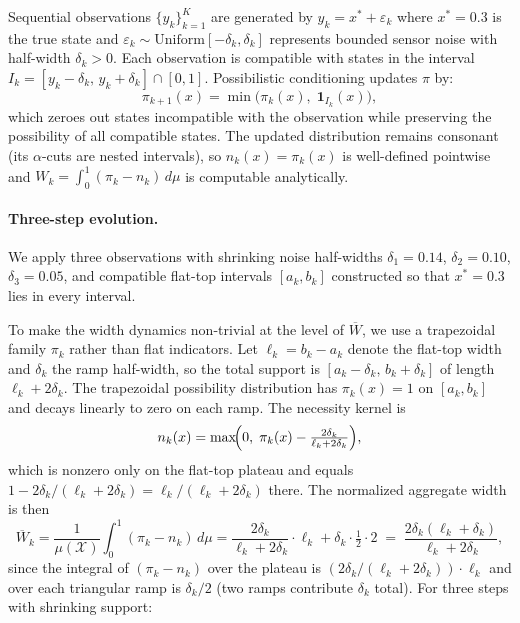 \documentclass[12pt]{article}
\newcommand{\calX}{\mathcal{X}}
\begin{document}
Sequential observations $\{y_k\}_{k=1}^K$ are generated by $y_k = x^* + \varepsilon_k$
where $x^* = 0.3$ is the true state and $\varepsilon_k \sim \mathrm{Uniform}[-\delta_k, \delta_k]$
represents bounded sensor noise with half-width $\delta_k > 0$.
Each observation is compatible with states in the interval
$I_k = [y_k - \delta_k,\, y_k + \delta_k] \cap [0,1]$.
Possibilistic conditioning updates $\pi$ by:
\begin{equation}
\pi_{k+1}(x) = \min\!\bigl(\pi_k(x),\; \mathbf{1}_{I_k}(x)\bigr),
\label{eq:scalar_update}
\end{equation}
which zeroes out states incompatible with the observation while preserving
the possibility of all compatible states.
The updated distribution remains consonant (its $\alpha$-cuts are nested
intervals), so $n_k(x) = \pi_k(x)$ is well-defined pointwise and
$W_k = \int_0^1 (\pi_k - n_k)\,d\mu$ is computable analytically.

\paragraph{Three-step evolution.}
We apply three observations with shrinking noise half-widths
$\delta_1=0.14$, $\delta_2=0.10$, $\delta_3=0.05$,
and compatible flat-top intervals $[a_k,b_k]$ constructed so that
$x^*=0.3$ lies in every interval.

To make the width dynamics non-trivial at the level of $\overline{W}$, we
use a trapezoidal family $\pi_k$ rather than flat indicators.
Let $\ell_k = b_k - a_k$ denote the flat-top width and $\delta_k$ the
ramp half-width, so the total support is $[a_k - \delta_k,\, b_k + \delta_k]$
of length $\ell_k + 2\delta_k$.
The trapezoidal possibility distribution has $\pi_k(x) = 1$ on $[a_k, b_k]$
and decays linearly to zero on each ramp.
The necessity kernel is
\begin{equation}
n_k(x) = \max\!\Bigl(0,\; \pi_k(x) - \tfrac{2\delta_k}{\ell_k + 2\delta_k}\Bigr),
\label{eq:trapez_n}
\end{equation}
which is nonzero only on the flat-top plateau and equals
$1 - 2\delta_k/(\ell_k + 2\delta_k) = \ell_k/(\ell_k + 2\delta_k)$ there.
The normalized aggregate width is then
\begin{equation}
\overline{W}_k
= \frac{1}{\mu(\calX)}\int_0^1 (\pi_k - n_k)\,d\mu
= \frac{2\delta_k}{\ell_k + 2\delta_k}\cdot\ell_k
  + \delta_k\cdot\tfrac{1}{2}\cdot 2
  \;=\; \frac{2\delta_k(\ell_k + \delta_k)}{\ell_k + 2\delta_k},
\label{eq:Wbar_trapez}
\end{equation}
since the integral of $(\pi_k - n_k)$ over the plateau is $(2\delta_k/(\ell_k+2\delta_k))\cdot\ell_k$
and over each triangular ramp is $\delta_k/2$ (two ramps contribute $\delta_k$ total).
For three steps with shrinking support:
\end{document}
